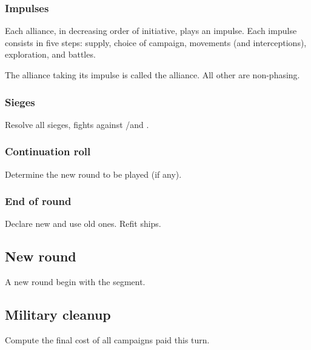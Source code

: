 \subsubsection{Impulses}
Each alliance, in decreasing order of initiative, plays an impulse. Each
impulse consists in five steps: supply, choice of campaign, movements (and
interceptions), exploration, and battles.

The alliance taking its impulse is called the  alliance. All
other are non-phasing.

\subsubsection{Sieges}
Resolve all sieges, fights against \REVOLT/\REBELLION and \corsaire.

\subsubsection{Continuation roll}
Determine the new round to be played (if any).

\subsubsection{End of round}
Declare new  and use old ones. Refit 
ships.

\subsection{New round}
A new round begin with the  segment.

\subsection{Military cleanup}
Compute the final cost of all campaigns paid this turn.

